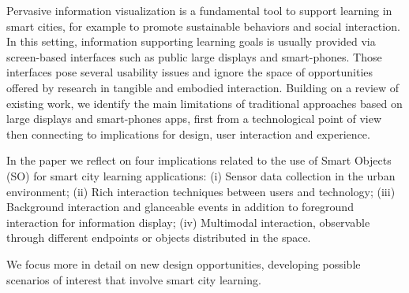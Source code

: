 Pervasive information visualization is a fundamental tool to support learning in smart cities, for example to promote sustainable behaviors and social interaction. In this setting, information supporting learning goals is usually provided via screen-based interfaces such as public large displays and smart-phones. Those interfaces pose several usability issues and ignore the space of opportunities offered by research in tangible and embodied interaction.
Building on a review of existing work, we identify the main limitations of traditional approaches based on large displays and smart-phones apps, first from a technological point of view then connecting to implications for design, user interaction and experience.

In the paper we reflect on four implications related to the use of Smart Objects (SO) for smart city learning applications: (i) Sensor data collection in the urban environment; (ii) Rich interaction techniques between users and technology; (iii) Background interaction and glanceable events in addition to foreground interaction for information display; (iv) Multimodal interaction, observable through different endpoints or objects distributed in the space.

We focus more in detail on new design opportunities, developing possible scenarios of interest that involve smart city learning.
